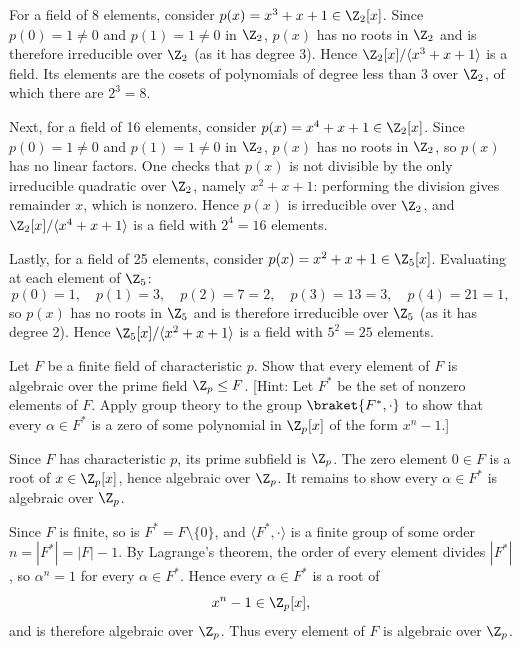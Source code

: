 \begin{solution}
  For a field of 8 elements, consider $p(x) = x^3 + x + 1 \in \Z_2[x]$. Since $p(0) = 1 \neq 0$ and $p(1) = 1 \neq 0$ in $\Z_2$, $p(x)$ has no roots in $\Z_2$ and is therefore irreducible over $\Z_2$ (as it has degree 3). Hence $\Z_2[x]/\langle x^3 + x + 1 \rangle$ is a field. Its elements are the cosets of polynomials of degree less than 3 over $\Z_2$, of which there are $2^3 = 8$.

  Next, for a field of 16 elements, consider $p(x) = x^4 + x + 1 \in \Z_2[x]$. Since $p(0) = 1 \neq 0$ and $p(1) = 1 \neq 0$ in $\Z_2$, $p(x)$ has no roots in $\Z_2$, so $p(x)$ has no linear factors. One checks that $p(x)$ is not divisible by the only irreducible quadratic over $\Z_2$, namely $x^2 + x + 1$: performing the division gives remainder $x$, which is nonzero. Hence $p(x)$ is irreducible over $\Z_2$, and $\Z_2[x]/\langle x^4 + x + 1 \rangle$ is a field with $2^4 = 16$ elements.

  Lastly, for a field of 25 elements, consider $p(x) = x^2 + x + 1 \in \Z_5[x]$. Evaluating at each element of $\Z_5$:
  \[%
    p(0) = 1,\quad p(1) = 3,\quad p(2) = 7 = 2,\quad p(3) = 13 = 3,\quad p(4) = 21 = 1
  ,\]%
  so $p(x)$ has no roots in $\Z_5$ and is therefore irreducible over $\Z_5$ (as it has degree 2). Hence $\Z_5[x]/\langle x^2 + x + 1 \rangle$ is a field with $5^2 = 25$ elements.
\end{solution}

\begin{problem}[39.36]
  Let $F$ be a finite field of characteristic $p$. Show that every element of $F$ is algebraic over the prime field $\Z_p \le F$. [Hint: Let $F^*$ be the set of nonzero elements of $F$. Apply group theory to the group $\braket{F^*, \cdot}$ to show that every $\alpha \in F^*$ is a zero of some polynomial in $\Z_p[x]$ of the form $x^n - 1$.]
\end{problem}

\begin{solution}
  Since $F$ has characteristic $p$, its prime subfield is $\Z_p$. The zero element $0 \in F$ is a root of $x \in \Z_p[x]$, hence algebraic over $\Z_p$. It remains to show every $\alpha \in F^*$ is algebraic over $\Z_p$.

  Since $F$ is finite, so is $F^* = F \setminus \{0\}$, and $\langle F^*, \cdot \rangle$ is a finite group of some order $n = |F^*| = |F| - 1$. By Lagrange's theorem, the order of every element divides $|F^*|$, so $\alpha^n = 1$ for every $\alpha \in F^*$. Hence every $\alpha \in F^*$ is a root of
  \[%
    x^n - 1 \in \Z_p[x]
  ,\]%
  and is therefore algebraic over $\Z_p$. Thus every element of $F$ is algebraic over $\Z_p$.
\end{solution}

